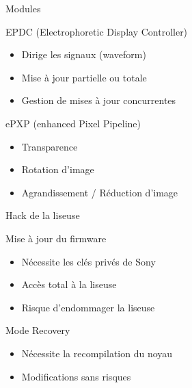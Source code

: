 \begin{frame}{Modules}
	\vspace{-25px}
	\begin{block}{EPDC (Electrophoretic Display Controller)}
		\begin{itemize}
			\item{Dirige les signaux (waveform)}
			\item{Mise à jour partielle ou totale}
			\item{Gestion de mises à jour concurrentes}
		\end{itemize}
	\end{block}
	\begin{block}{ePXP (enhanced Pixel Pipeline)}
		\begin{itemize}
			\item Transparence
			\item Rotation d'image
			\item Agrandissement / Réduction d'image
		\end{itemize}
	\end{block}
\end{frame}

\begin{frame}{Hack de la liseuse}
	\begin{block}{Mise à jour du firmware}
		\begin{itemize}
			\item Nécessite les clés privés de Sony
			\item Accès total à la liseuse
			\item Risque d'endommager la liseuse
		\end{itemize}
	\end{block}
	\begin{block}{Mode Recovery}
		\begin{itemize}
			\item Nécessite la recompilation du noyau
			\item Modifications sans risques
		\end{itemize}
	\end{block}
\end{frame}
